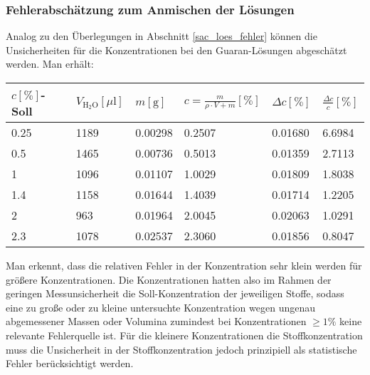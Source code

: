 \documentclass[11pt,a4paper,oneside]{scrartcl}
\begin{document}
\subsubsection{Fehlerabschätzung zum Anmischen der Lösungen}
Analog zu den Überlegungen in Abschnitt \ref{sac_loes_fehler} können die Unsicherheiten für die Konzentrationen bei den Guaran-Lösungen abgeschätzt werden. Man erhält:\\
\begin{table}[H]
    \centering
    \begin{tabular}{llllll}
    \hline
        $c [\%]$-Soll & $V_{\mathrm{H_2O}} [\mu \mathrm l]$ & $m [\mathrm g]$ & $c=\frac{m}{\rho\cdot V+m}[\%]$ & $\Delta c[\%]$ & $\frac{\Delta c}{c}[\%]$ \\ \hline
             0.25 & 1189 & 0.00298 & 0.2507 & 0.01680 & 6.6984 \\ 
        0.5 & 1465 & 0.00736 & 0.5013 & 0.01359 & 2.7113 \\ 
        1 & 1096 & 0.01107 & 1.0029 & 0.01809 & 1.8038 \\ 
        1.4 & 1158 & 0.01644 & 1.4039 & 0.01714 & 1.2205 \\ 
        2 & 963 & 0.01964 & 2.0045 & 0.02063 & 1.0291 \\ 
        2.3 & 1078 & 0.02537 & 2.3060 & 0.01856 & 0.8047 \\  \hline
    \end{tabular}
\end{table}
Man erkennt, dass die relativen Fehler in der Konzentration sehr klein werden für größere Konzentrationen. Die Konzentrationen hatten also im Rahmen der geringen Messunsicherheit die Soll-Konzentration der jeweiligen Stoffe, sodass eine zu große oder zu kleine untersuchte Konzentration wegen ungenau abgemessener Massen oder Volumina zumindest bei Konzentrationen $\geq 1\%$ keine relevante Fehlerquelle ist. Für die kleinere Konzentrationen die Stoffkonzentration muss die Unsicherheit in der Stoffkonzentration jedoch prinzipiell als statistische Fehler berücksichtigt werden.
\end{document}
